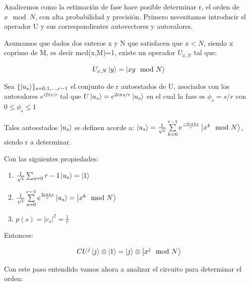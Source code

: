 Analicemos como la estimación de fase hace posible determinar r, el orden de $x \mod N$, con alta probabilidad y precisión. Primero necesitamos introducir el operador U y sus correspondientes autovectores y autovalores.

Asumamos que dados dos enteros x y N que satisfacen que $x<N$, siendo x coprimo de M, es decir mcd(x,M)=1, existe un operador $U_{x,N}$ tal que:

\begin{equation}
    U_{x,N} \ket{y} = \ket{x y \mod N}
\end{equation}

Sea $\{ \ket{u_s}\}_{s = 0, 1, ..., r-1}$ el conjunto de r autoestados de U, asociados con los autovalores $e^{i 2 \pi s/r}$ tal que $U \ket{u_s} = e^{2 i \pi s /r} \ket{u_s}$ en el cual la fase es $\phi_s = s/r$ con $0 \leq \phi_s \leq 1$

Tales autoestados $\ket{u_s}$ se definen acorde a: $\ket{u_s} = \frac{1}{\sqrt{r}} \sum\limits_{k=0}^{r-1} e^{\frac{-2 i \pi k s}{r}} \ket{x^k \mod N}$, siendo r a determinar.

Con las siguientes propiedades:

\begin{enumerate}
    \item $\frac{1}{\sqrt{r}} \sum_{s=0}{r-1} \ket{u_s} = \ket{1}$
    \item $\frac{1}{\sqrt{r}} \sum\limits_{s=0}^{r-1} e^{\frac{2 i \pi k s}{r}} \ket{u_s} = \ket{x^k \mod N}$
    \item $p(s) = |c_s|^2 = \frac{1}{r}$
\end{enumerate}

Entonces:

\begin{equation}
    CU^j \ket{j} \otimes \ket{1} = \ket{j} \otimes \ket{x^j \mod N}
\end{equation}

Con este paso entendido vamos ahora a analizar el circuito para determinar el orden:

